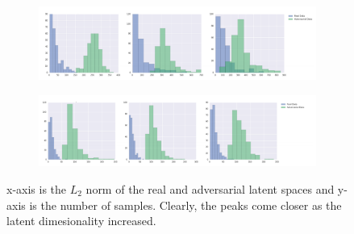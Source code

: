 \documentclass[journal]{IEEEtran}
\begin{document}
\begin{figure}[t]
	\centering
	\captionsetup{justification=centering}

	\begin{subfigure}{\textwidth}
		\centering
		\includegraphics[width=\textwidth]{Images/VAE/MNIST.png}
	\end{subfigure}
	\begin{subfigure}{\textwidth}
		\centering
		\includegraphics[width=\textwidth]{Images/VAE/SVHN.png}
	\end{subfigure}

	\caption{x-axis is the $L_2$ norm of the real and adversarial latent spaces and y-axis is the number of samples. Clearly, the peaks come closer as the latent dimesionality increased.}
	
	\label{fig: distance}
\end{figure}
\end{document}
